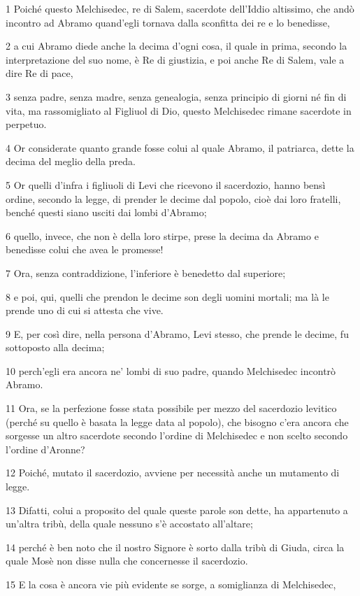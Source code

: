 \par 1 Poiché questo Melchisedec, re di Salem, sacerdote dell'Iddio altissimo, che andò incontro ad Abramo quand'egli tornava dalla sconfitta dei re e lo benedisse,
\par 2 a cui Abramo diede anche la decima d'ogni cosa, il quale in prima, secondo la interpretazione del suo nome, è Re di giustizia, e poi anche Re di Salem, vale a dire Re di pace,
\par 3 senza padre, senza madre, senza genealogia, senza principio di giorni né fin di vita, ma rassomigliato al Figliuol di Dio, questo Melchisedec rimane sacerdote in perpetuo.
\par 4 Or considerate quanto grande fosse colui al quale Abramo, il patriarca, dette la decima del meglio della preda.
\par 5 Or quelli d'infra i figliuoli di Levi che ricevono il sacerdozio, hanno bensì ordine, secondo la legge, di prender le decime dal popolo, cioè dai loro fratelli, benché questi siano usciti dai lombi d'Abramo;
\par 6 quello, invece, che non è della loro stirpe, prese la decima da Abramo e benedisse colui che avea le promesse!
\par 7 Ora, senza contraddizione, l'inferiore è benedetto dal superiore;
\par 8 e poi, qui, quelli che prendon le decime son degli uomini mortali; ma là le prende uno di cui si attesta che vive.
\par 9 E, per così dire, nella persona d'Abramo, Levi stesso, che prende le decime, fu sottoposto alla decima;
\par 10 perch'egli era ancora ne' lombi di suo padre, quando Melchisedec incontrò Abramo.
\par 11 Ora, se la perfezione fosse stata possibile per mezzo del sacerdozio levitico (perché su quello è basata la legge data al popolo), che bisogno c'era ancora che sorgesse un altro sacerdote secondo l'ordine di Melchisedec e non scelto secondo l'ordine d'Aronne?
\par 12 Poiché, mutato il sacerdozio, avviene per necessità anche un mutamento di legge.
\par 13 Difatti, colui a proposito del quale queste parole son dette, ha appartenuto a un'altra tribù, della quale nessuno s'è accostato all'altare;
\par 14 perché è ben noto che il nostro Signore è sorto dalla tribù di Giuda, circa la quale Mosè non disse nulla che concernesse il sacerdozio.
\par 15 E la cosa è ancora vie più evidente se sorge, a somiglianza di Melchisedec,
